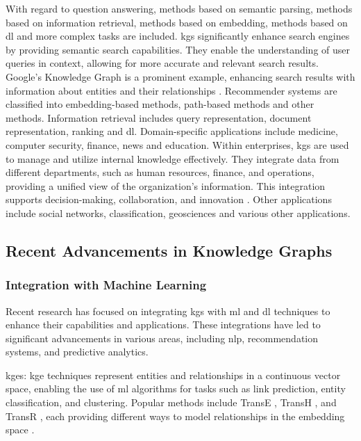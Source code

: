 With regard to question answering, methods based on semantic parsing, methods based on information retrieval, methods based on embedding, methods based on \gls{dl} and more complex tasks are included.
\glspl{kg} significantly enhance search engines by providing semantic search capabilities. They enable the understanding of user queries in context, allowing for more accurate and relevant search results. Google's Knowledge Graph is a prominent example, enhancing search results with information about entities and their relationships \cite{singhal2012introducing}.
Recommender systems are classified into embedding-based methods, path-based methods and other methods. Information retrieval includes query representation, document representation, ranking and \gls{dl}. Domain-specific applications include medicine, computer security, finance, news and education.
Within enterprises, \glspl{kg} are used to manage and utilize internal knowledge effectively. They integrate data from different departments, such as human resources, finance, and operations, providing a unified view of the organization's information. This integration supports decision-making, collaboration, and innovation \cite{pujara2013knowledge}.
Other applications include social networks, classification, geosciences and various other applications.


\subsection*{Recent Advancements in Knowledge Graphs}

\subsubsection*{Integration with Machine Learning}
Recent research has focused on integrating \glspl{kg} with \gls{ml} and \gls{dl} techniques to enhance their capabilities and applications. These integrations have led to significant advancements in various areas, including \gls{nlp}, recommendation systems, and predictive analytics.

\glspl{kge}: \gls{kge} techniques represent entities and relationships in a continuous vector space, enabling the use of \gls{ml} algorithms for tasks such as link prediction, entity classification, and clustering. Popular methods include TransE \cite{Bordes2013}, TransH \cite{Wang2014}, and TransR \cite{Lin2015}, each providing different ways to model relationships in the embedding space \cite{Wang2017}.

